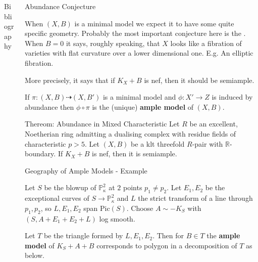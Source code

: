 \documentclass[final]{beamer}
\begin{document}
\begin{frame}[t, fragile]
\begin{columns}[t]
\begin{column}{0.14\paperwidth}
			
			\begin{block}{Bibliography}
				\printbibliography
			\end{block}
			
		\end{column}
		
		
		\begin{column}{0.36\paperwidth}
			
			\begin{block}{Abundance Conjecture}
				
				When $(X,B)$ is a minimal model we expect it to have some quite specific geometry. Probably the most important conjecture here is the . When $B=0$ it says, roughly speaking, that $X$ looks like a fibration of varieties with flat curvature over a lower dimensional one. E.g. An elliptic fibration. 
				
				More precisely, it says that if $K_X+B$ is nef, then it should be semiample.
				
				If $\pi:(X,B) \dashrightarrow (X,B')$ is a minimal model and $\phi: X' \to Z$ is induced by abundance then $\phi \circ \pi $ is the (unique) \textbf{ample model} of $(X,B)$.
			\end{block}  
			
			\begin{alertblock}{Thereom: Abundance in Mixed Characteristic}
				Let $R$ be an excellent, Noetherian ring admitting a dualising complex with residue fields of characteristic $p > 5$.
				Let $(X,B)$ be a klt threefold $R$-pair with $\mathbb{R}$-boundary. If $K_X+B$ is nef, then it is semiample.
			\end{alertblock}  
			
			\begin{block}{Geography of Ample Models - Example}
				
				Let $S$ be the blowup of $\mathbb{P}^{2}_{\kappa}$ at $2$ points $p_{1} \neq p_{2}$. Let $E_{1},E_{2}$ be the exceptional curves of $S \to \mathbb{P}^{2}_{\kappa}$ and $L$ the strict transform of a line through $p_{1}, p_{2}$, so $L,E_{1},E_{2}$ span $\text{Pic}(S)$. Choose $A \sim -K_{S}$ with $(S,A+E_{1}+E_{2}+L)$ log smooth. 
				
				Let $T$ be the triangle formed by $L,E_{1},E_{2}$. Then for $B \in T$ the \textbf{ample model} of $K_{S}+A+B$ corresponds to polygon in a decomposition of $T$ as below.
				
				\begin{center}
					

\end{center}
\end{block}
\end{column}
\end{columns}
\end{frame}
\end{document}
